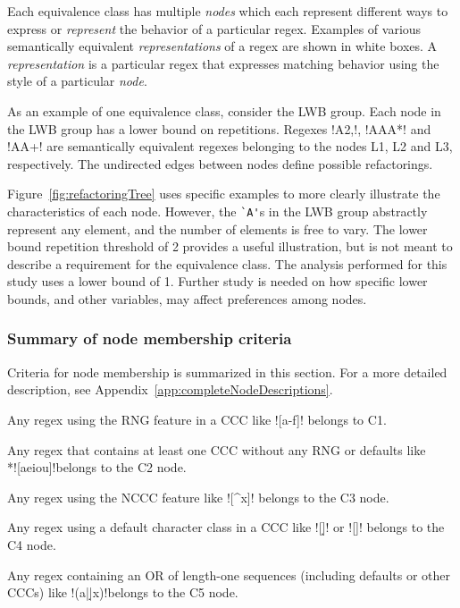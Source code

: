 Each equivalence class has multiple \emph{nodes} which each represent different ways to express or \emph{represent} the behavior of a particular regex.  Examples of various semantically equivalent \emph{representations} of a regex are shown in white boxes. A \emph{representation} is a particular regex that expresses matching behavior using the style of a particular \emph{node}.

As an example of one equivalence class, consider the LWB group.  Each node in the LWB group has a lower bound on repetitions. Regexes \cverb!A{2,}!, \cverb!AAA*! and \cverb!AA+! are semantically equivalent regexes belonging to the nodes L1, L2 and L3, respectively.
The undirected edges between nodes define possible refactorings.

Figure~\ref{fig:refactoringTree} uses specific examples to more clearly illustrate the characteristics of each node.  However, the \verb!`A'!s in the LWB group abstractly represent any element, and the number of elements is free to vary. The lower bound repetition threshold of 2 provides a useful illustration, but is not meant to describe a requirement for the equivalence class.  The analysis performed for this study uses a lower bound of 1.  Further study is needed on how specific lower bounds, and other variables, may affect preferences among nodes.

\subsubsection{Summary of node membership criteria}
Criteria for node membership is summarized in this section.  For a more detailed description, see Appendix~\ref{app:completeNodeDescriptions}.

\begin{description}  \itemsep -1pt
\item[C1:] Any regex using the RNG feature in a CCC like \cverb![a-f]! belongs to C1.
\item[C2:] Any regex that contains at least one CCC without any RNG or defaults like \\*\cverb![aeiou]!belongs to the C2 node.
\item[C3:] Any regex using the NCCC feature like \cverb![^x]! belongs to the C3 node.
\item[C4:] Any regex using a default character class in a CCC like \cverb![\d]! or \cverb![\W]! belongs to the C4 node.
\item[C5:] Any regex containing an OR of length-one sequences (including defaults or other CCCs) like \cverb!(a|\d|x)!belongs to the C5 node.
\end{description}


